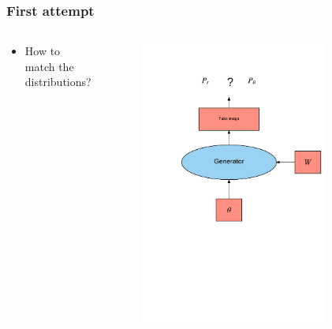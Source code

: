 \documentclass{beamer}
\begin{document}
\begin{frame}
\frametitle{First attempt}
\begin{columns}
\begin{column}{0.5\textwidth}
\begin{itemize}
	\item How to match the distributions?
\end{itemize}
\end{column}
\begin{column}{0.5\textwidth}  %
\begin{figure}[h!]
	\centering
	\includegraphics[width=0.8\textwidth]{first_attempt_gan.png}
\end{figure}
\end{column}
\end{columns}


\end{frame}
\end{document}

